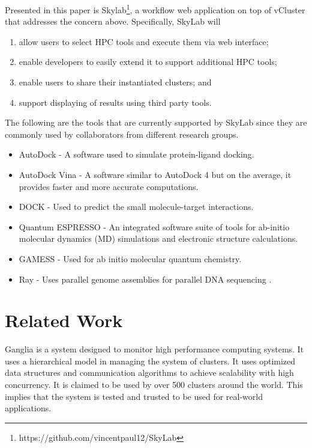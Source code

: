 Presented in this paper is Skylab\footnote{https://github.com/vincentpaul12/SkyLab}, a workflow web application on top of vCluster that addresses the concern above. Specifically, SkyLab will  

\begin{enumerate}
	\item allow users to select HPC tools and execute them via web interface; 
	\item enable developers to easily extend it to support additional HPC tools;
	\item enable users to share their instantiated clusters; and
	\item support displaying of results using third party tools.
\end{enumerate}
   
The following are the tools that are currently supported by SkyLab since they are commonly used by collaborators from different research groups.

\begin{itemize}
    	\item AutoDock - A software used to simulate protein-ligand docking\cite{morris2009autodock4}.

        \item AutoDock Vina - A software similar to AutoDock 4 but on the average, it provides faster and more accurate computations\cite{JCC:JCC21334}. 
            
		\item DOCK - Used to predict the small molecule-target interactions\cite{lang2009dock}.
            
      	\item Quantum ESPRESSO - An integrated software suite of tools for ab-initio molecular dynamics (MD) simulations and electronic structure calculations\cite{QE-2009}.

  		\item GAMESS - Used for ab initio molecular quantum chemistry. \cite{1993gamess}
            
 	    \item Ray - Uses parallel genome assemblies for parallel DNA sequencing \cite{boisvert_ray_2012}.

\end{itemize}   
      
\section {Related Work}
Ganglia is a system designed to monitor high performance computing systems. It uses a hierarchical model in managing the system of clusters. It uses optimized data structures and communication algorithms to achieve scalability with high concurrency. It is claimed to be used by over 500 clusters around the world. This implies that the system is tested and trusted to be used for real-world applications\cite{1395654820040701}.
	    
